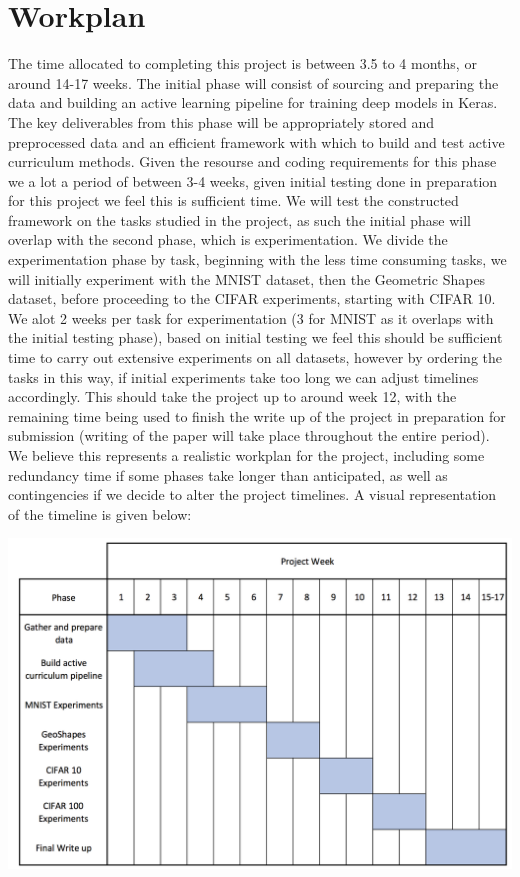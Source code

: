 \documentclass[a4paper,11pt]{article}
\begin{document}
\section{Workplan}
The time allocated to completing this project is between 3.5 to 4 months, or around 14-17 weeks. The initial phase will consist of sourcing and preparing the data and building an active learning pipeline for training deep models in Keras. The key deliverables from this phase will be appropriately stored and preprocessed data and an efficient framework with which to build and test active curriculum methods. Given the resourse and coding requirements for this phase we a lot a period of between 3-4 weeks, given initial testing done in preparation for this project we feel this is sufficient time. We will test the constructed framework on the tasks studied in the project, as such the initial phase will overlap with the second phase, which is experimentation. We divide the experimentation phase by task, beginning with the less time consuming tasks, we will initially experiment with the MNIST dataset, then the Geometric Shapes dataset, before proceeding to the CIFAR experiments, starting with CIFAR 10. We alot 2 weeks per task for experimentation (3 for MNIST as it overlaps with the initial testing phase), based on initial testing we feel this should be sufficient time to carry out extensive experiments on all datasets, however by ordering the tasks in this way, if initial experiments take too long we can adjust timelines accordingly. This should take the project up to around week 12, with the remaining time being used to finish the write up of the project in preparation for submission (writing of the paper will take place throughout the entire period). We believe this represents a realistic workplan for the project, including some redundancy time if some phases take longer than anticipated, as well as contingencies if we decide to alter the project timelines. A visual representation of the timeline is given below:

\begin{center}
\includegraphics[width=6in]{Timeline_2.png}
\end{center}
\end{document}
